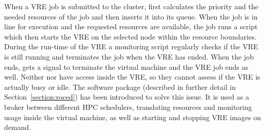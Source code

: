 When a VRE job is submitted to the \NEMO cluster, \Moab  first calculates the
priority and the needed resources of the job and then inserts it into its queue.
When the job is in line for execution and the requested resources are available,
the job  runs a script which then starts the VRE on the selected node
within the resource boundaries. During the run-time of the VRE a monitoring
script regularly checks if the VRE is still running and terminates the job when
the VRE has ended.
When the job ends, \Openstack gets a signal to terminate the virtual machine and
the VRE job ends as well.  Neither \Moab nor \Openstack have access
inside the VRE, so they cannot assess if the VRE is actually busy or
idle.
The software package \Roced (described in
further detail in Section~\ref{section:roced}) has been introduced to
solve this issue.
It is used as a broker between
different HPC schedulers,  translating resources and monitoring usage inside the
virtual machine, as well as starting and stopping VRE images on demand.
